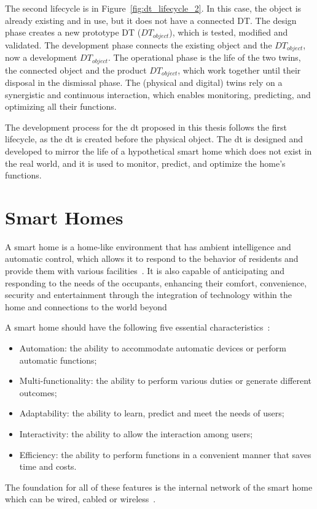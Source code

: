The second lifecycle is in Figure~\ref{fig:dt_lifecycle_2}. In this case, the object is already existing and in use, but it does not have a connected DT. The design phase creates a new prototype DT ($DT_{object}$), which is tested, modified and validated. The development phase connects the existing object and the $DT_{object}$, now a development $DT_{object}$. The operational phase is the life of the two twins, the connected object and the product $DT_{object}$, which work together until their disposal in the dismissal phase. The (physical and digital) twins rely on a synergistic and continuous interaction, which enables monitoring, predicting, and optimizing all their functions.

The development process for the \acrshort{dt} proposed in this thesis follows the first lifecycle, as the \acrshort{dt} is created before the physical object. The \acrshort{dt} is designed and developed to mirror the life of a hypothetical smart home which does not exist in the real world, and it is used to monitor, predict, and optimize the home's functions.

\section{Smart Homes}

A smart home is a home-like environment that has ambient intelligence and automatic control, which allows it to respond to the behavior of residents and provide them with various facilities~\parencite{desilvaStateArtSmart2012}. It is also capable of anticipating and responding to the needs of the occupants, enhancing their comfort, convenience, security and entertainment through the integration of technology within the home and connections to the world beyond~\parencite{aldrichSmartHomesPresent2003}

A smart home should have the following five essential characteristics~\parencite{leSmartHomesOlder2012}:
\begin{itemize}
    \item Automation: the ability to accommodate automatic devices or perform automatic functions;
    \item Multi-functionality: the ability to perform various duties or generate different outcomes;
    \item Adaptability: the ability to learn, predict and meet the needs of users;
    \item Interactivity: the ability to allow the interaction among users;
    \item Efficiency: the ability to perform functions in a convenient manner that saves time and costs.
\end{itemize}
The foundation for all of these features is the internal network of the smart home which can be wired, cabled or wireless~\parencite{jiangSmartHomeResearch2004}.

